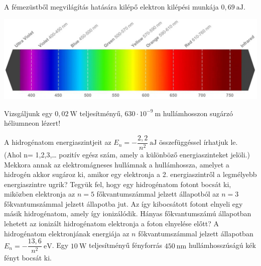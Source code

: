 \documentclass[addpoints,11pt,a4paper]{exam}
\begin{document}
	
	
	\begin{questions}
		\question A fémezüstből megvilágítás hatására kilépő elektron kilépési munkája $0,69 \mathrm{~aJ}$.  
		\begin{center}
			\includegraphics[width=.6\textwidth]{abra01}
		\end{center}
		\question Vizsgáljunk egy $0,02\mathrm{~W}$ teljesítményű, $630\cdot 10^{-9}\mathrm{~m}$ hullámhosszon sugárzó héliumneon lézert!
		\question A hidrogénatom energiaszintjeit az  $E_n=-\dfrac{2,2}{n^{2}}\mathrm{~aJ}$ összefüggéssel írhatjuk le. (Ahol n= 1,2,3,… pozitív egész szám, amely a különböző energiaszinteket jelöli.) Mekkora annak az elektromágneses hullámnak a hullámhossza, amelyet a hidrogén akkor sugároz ki, amikor egy elektronja a 2. energiaszintről a legmélyebb energiaszintre ugrik?
		\newpage
		\question Tegyük fel, hogy egy hidrogénatom fotont bocsát ki, miközben elektronja az $n = 5$ főkvantumszámmal jelzett állapotból az $n = 3$ főkvantumszámmal jelzett állapotba jut. Az így kibocsátott fotont elnyeli egy másik hidrogénatom, amely így ionizálódik. Hányas főkvantumszámú állapotban lehetett az ionizált hidrogénatom elektronja a foton elnyelése előtt? A hidrogénatom elektronjának energiája az $n$ főkvantumszámmal jelzett állapotban $E_n = -\dfrac{13,6}{n^{2}}\mathrm{~eV}$. 
		\question Egy $10\mathrm{~W} $ teljesítményű fényforrás $450\mathrm{~nm}$ hullámhosszúságú kék fényt bocsát ki.
		\begin{parts}

\end{parts}
\end{questions}
\end{document}
